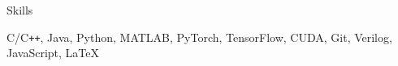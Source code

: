 \documentclass{resume}
\newcommand{\InternalSpace}{\vspace{0.18cm}}
\newcommand{\ExternalSpace}{\vspace{-0.09cm}}
\newenvironment{MySection}[1]
{\begin{category}{#1}}
{\end{category}}
\newcommand{\MyItem}{\citembullet}
\begin{document}













\begin{MySection}{Skills}

\MyItem 
C/C\texttt{++}, Java, Python, MATLAB, PyTorch, TensorFlow, CUDA, Git, Verilog, JavaScript, \LaTeX

\end{MySection}
\end{document}
